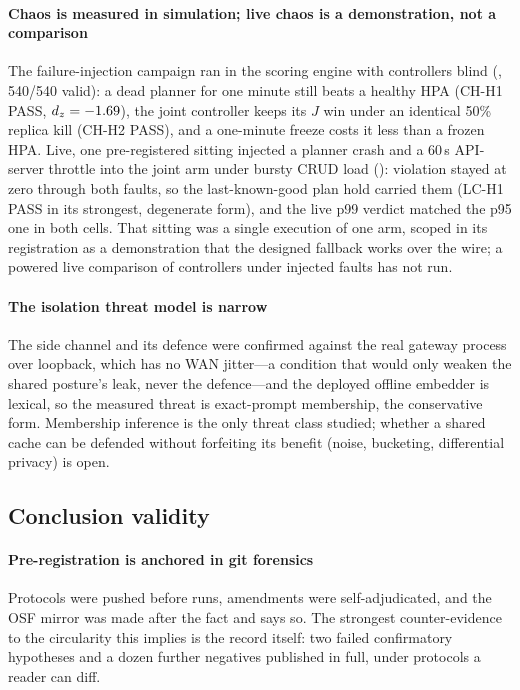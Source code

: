\paragraph{Chaos is measured in simulation; live chaos is a demonstration,
not a comparison} The failure-injection campaign ran in the scoring
engine with controllers blind (, 540/540
valid): a dead planner for one minute still beats a healthy HPA (CH-H1
PASS, $d_z = -1.69$), the joint controller keeps its $J$ win under an
identical 50\% replica kill (CH-H2 PASS), and a one-minute freeze costs it
less than a frozen HPA. Live, one pre-registered sitting injected a planner
crash and a 60\,s API-server throttle into the joint arm under bursty CRUD
load (): violation stayed at zero
through both faults, so the last-known-good plan hold carried them (LC-H1
PASS in its strongest, degenerate form), and the live p99 verdict matched
the p95 one in both cells. That sitting was a single execution of one arm,
scoped in its registration as a demonstration that the designed fallback
works over the wire; a powered live comparison of controllers under
injected faults has not run.

\paragraph{The isolation threat model is narrow} The side channel and its
defence were confirmed against the real gateway process over loopback,
which has no WAN jitter---a condition that would only weaken the shared
posture's leak, never the defence---and the deployed offline embedder is
lexical, so the measured threat is exact-prompt membership, the
conservative form. Membership inference is the only threat class studied;
whether a shared cache can be defended without forfeiting its benefit
(noise, bucketing, differential privacy) is open.

\subsection{Conclusion validity}

\paragraph{Pre-registration is anchored in git forensics} Protocols were
pushed before runs, amendments were self-adjudicated, and the OSF mirror
was made after the fact and says so. The strongest counter-evidence to
the circularity this implies is the record itself: two failed confirmatory
hypotheses and a dozen further negatives published in full, under
protocols a reader can diff.

